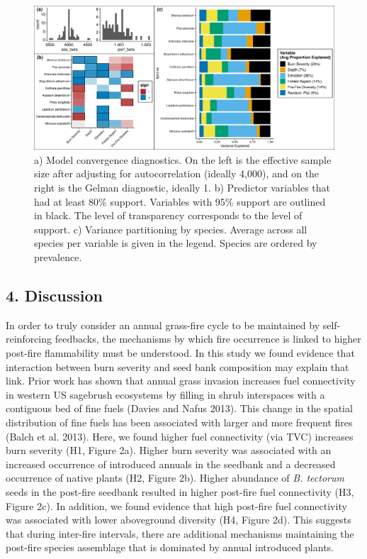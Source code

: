 \documentclass[
  12pt,
]{article}
\begin{document}
\begin{figure}
\centering
\includegraphics{images/jsdm_stuff.png}
\caption{a) Model convergence diagnostics. On the left is the effective
sample size after adjusting for autocorrelation (ideally 4,000), and on
the right is the Gelman diagnostic, ideally 1. b) Predictor variables
that had at least 80\% support. Variables with 95\% support are outlined
in black. The level of transparency corresponds to the level of support.
c) Variance partitioning by species. Average across all species per
variable is given in the legend. Species are ordered by prevalence.}
\end{figure}

\hypertarget{discussion}{%
\subsection{4. Discussion}\label{discussion}}

In order to truly consider an annual grass-fire cycle to be maintained
by self-reinforcing feedbacks, the mechanisms by which fire occurrence
is linked to higher post-fire flammability must be understood. In this
study we found evidence that interaction between burn severity and seed
bank composition may explain that link. Prior work has shown that annual
grass invasion increases fuel connectivity in western US sagebrush
ecosystems by filling in shrub interspaces with a contiguous bed of fine
fuels (Davies and Nafus 2013). This change in the spatial distribution
of fine fuels has been associated with larger and more frequent fires
(Balch et al. 2013). Here, we found higher fuel connectivity (via TVC)
increases burn severity (H1, Figure 2a). Higher burn severity was
associated with an increased occurrence of introduced annuals in the
seedbank and a decreased occurrence of native plants (H2, Figure 2b).
Higher abundance of \emph{B. tectorum} seeds in the post-fire seedbank
resulted in higher post-fire fuel connectivity (H3, Figure 2c). In
addition, we found evidence that high post-fire fuel connectivity was
associated with lower aboveground diversity (H4, Figure 2d). This
suggests that during inter-fire intervals, there are additional
mechanisms maintaining the post-fire species assemblage that is
dominated by annual introduced plants.
\end{document}
